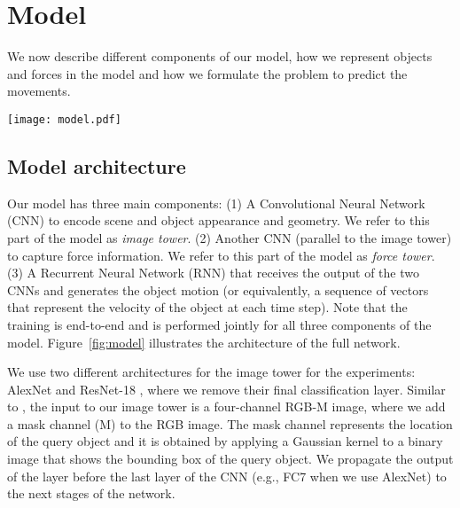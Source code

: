 \documentclass[runningheads]{llncs}
\begin{document}
\section{Model}
\label{sec:model}
We now describe different components of our model, how we represent objects and forces in the model and how we formulate the problem to predict the movements. 
\begin{figure*}[t]
\centering
  \texttt{[image: model.pdf]}
\caption{\textbf{Model.} Our model consists of two CNNs for capturing the \emph{force} and \emph{image} information. We refer to these CNNs as force tower and image tower respectively. The input to the model is a force image and an RGB-M image (RGB image plus an M channel representing object bounding box). The color in the force image represents the direction and magnitude of the force (according to the color wheel). The symbol $\copyright$ denotes concatenation. `Identity' propagates the input to the output with no change. $h_t$ represents the hidden layer of the RNN at time step $t$. Also, we use the abbreviation FC for a fully connected layer. The output of our model is a sequence of velocity \emph{directions} at each time step. We consider 17 directions and an additional `stop' class, which is shown by a red circle. The green ellipses show the chosen direction at each time step. The RNN stops when it generates the `stop' class.}
\label{fig:model}
\end{figure*} 


\subsection{Model architecture}
Our model has three main components: (1) A Convolutional Neural Network (CNN) to encode scene and object appearance and geometry. We refer to this part of the model as \emph{image tower}. (2) Another CNN (parallel to the image tower) to capture force information. We refer to this part of the model as \emph{force tower}. (3) A Recurrent Neural Network (RNN) that receives the output of the two CNNs and generates the object motion (or equivalently, a sequence of vectors that represent the velocity of the object at each time step). Note that the training is end-to-end and is performed jointly for all three components of the model. Figure~\ref{fig:model} illustrates the architecture of the full network. 

We use two different architectures for the image tower for the experiments: AlexNet \cite{alexnet} and ResNet-18 \cite{he16}, where we remove their final classification layer. Similar to  \cite{mottaghi16}, the input to our image tower is a four-channel RGB-M image, where we add a mask channel (M) to the RGB image. The mask channel represents the location of the query object and it is obtained by applying a Gaussian kernel to a binary image that shows the bounding box of the query object. We propagate the output of the layer before the last layer of the CNN (e.g., FC7 when we use AlexNet) to the next stages of the network. 
\end{document}
